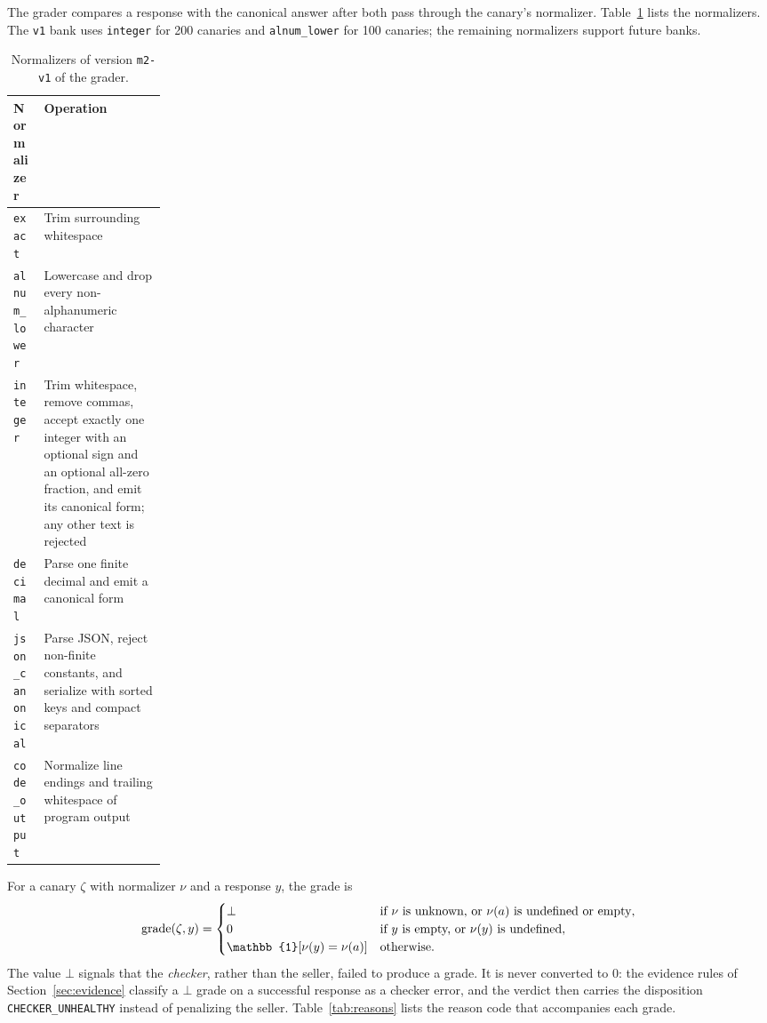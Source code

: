 The grader compares a response with the canonical answer after both pass
through the canary's normalizer. Table~\ref{tab:normalizers} lists the
normalizers. The \texttt{v1} bank uses \texttt{integer} for 200 canaries and
\texttt{alnum\_lower} for 100 canaries; the remaining normalizers support
future banks.

\begin{table}[htbp]
  \centering
  \small
  \begin{tabularx}{\linewidth}{@{}p{0.2\linewidth}X@{}}
    \toprule
    Normalizer & Operation \\
    \midrule
    \texttt{exact} & Trim surrounding whitespace \\
    \texttt{alnum\_lower} & Lowercase and drop every non-alphanumeric
      character \\
    \texttt{integer} & Trim whitespace, remove commas, accept exactly one
      integer with an optional sign and an optional all-zero fraction, and emit
      its canonical form; any other text is rejected \\
    \texttt{decimal} & Parse one finite decimal and emit a canonical form \\
    \texttt{json\_canonical} & Parse JSON, reject non-finite constants, and
      serialize with sorted keys and compact separators \\
    \texttt{code\_output} & Normalize line endings and trailing whitespace of
      program output \\
    \bottomrule
  \end{tabularx}
  \caption{Normalizers of version \texttt{m2-v1} of the grader.}
  \label{tab:normalizers}
\end{table}

For a canary $\zeta$ with normalizer $\nu$ and a response $y$, the grade is
\begin{equation}
  \label{eq:grade}
  \grade(\zeta, y) =
  \begin{cases}
    \bot & \text{if } \nu \text{ is unknown, or } \nu(a) \text{ is undefined or
      empty},\\
    0 & \text{if } y \text{ is empty, or } \nu(y) \text{ is undefined},\\
    \mathbb{1}\!\left[\nu(y) = \nu(a)\right] & \text{otherwise.}
  \end{cases}
\end{equation}
The value $\bot$ signals that the \emph{checker}, rather than the seller,
failed to produce a grade. It is never converted to $0$: the evidence rules of
Section~\ref{sec:evidence} classify a $\bot$ grade on a successful response as
a checker error, and the verdict then carries the disposition
\texttt{CHECKER\_UNHEALTHY} instead of penalizing the seller.
Table~\ref{tab:reasons} lists the reason code that accompanies each grade.

